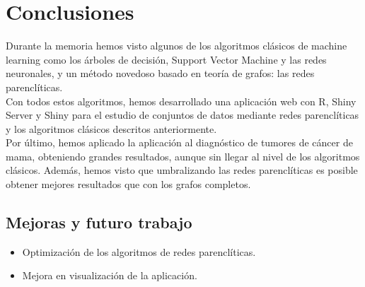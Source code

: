 \chapter{Conclusiones}
Durante la memoria hemos visto algunos de los algoritmos clásicos de machine learning como los árboles de decisión, Support  Vector Machine y las redes neuronales, y un método novedoso basado en teoría de grafos: las redes parenclíticas.\\

Con todos estos algoritmos, hemos desarrollado una aplicación web con R, Shiny Server y Shiny para el estudio de conjuntos de datos mediante redes parenclíticas y los algoritmos clásicos descritos anteriormente.\\

Por último, hemos aplicado la aplicación al diagnóstico de tumores de cáncer de mama, obteniendo grandes resultados, aunque sin llegar al nivel de los algoritmos clásicos. Además, hemos visto que umbralizando las redes parenclíticas es posible obtener mejores resultados que con los grafos completos.
   
\section{Mejoras y futuro trabajo}

\begin{itemize}
	\item Optimización de los algoritmos de redes parenclíticas.
	\item Mejora en visualización de la aplicación.
\end{itemize}